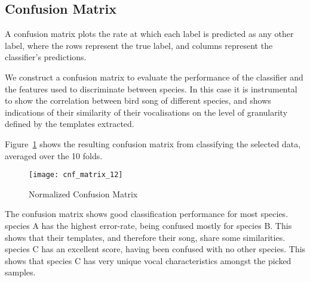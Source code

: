 \subsection{Confusion Matrix}
A confusion matrix plots the rate at which each label is predicted as any other
label, where the rows represent the true label, and columns represent the
classifier's predictions.

We construct a confusion matrix to evaluate the performance of the classifier
and the features used to discriminate between species.
In this case it is instrumental to show the correlation between bird song of
different species, and shows indications of their similarity of their
vocalisations on the level of granularity defined by the templates extracted.

Figure~\ref{fig:cnf12} shows the resulting confusion matrix from classifying the
selected data, averaged over the 10 folds.

\begin{figure}[!htb]
  \caption{Normalized Confusion Matrix}\label{fig:cnf12}
  \centering
  \texttt{[image: cnf\_matrix\_12]}
\end{figure}

The confusion matrix shows good classification performance for most species.\\

species A has the highest error-rate, being confused mostly for species B.
This shows that their templates, and therefore their song, share some
similarities.\\

species C has an excellent score, having been confused with no other species.
This shows that species C has very unique vocal characteristics amongst the
picked samples.
